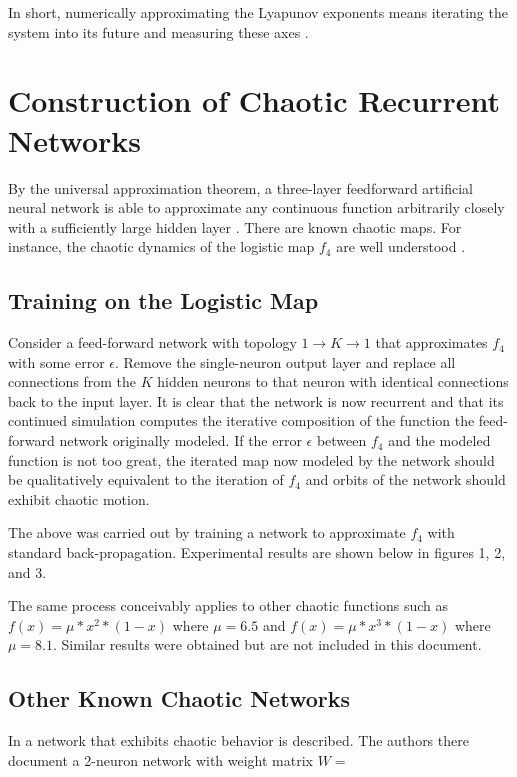 \documentclass[12pt]{article}
\begin{document}
In short, numerically approximating the Lyapunov exponents means
iterating the system into its future and measuring these axes \cite{sprott}.

\section{Construction of Chaotic Recurrent Networks}
By the universal approximation theorem, a three-layer feedforward artificial
neural network is able to approximate any continuous function arbitrarily
closely with a sufficiently large hidden layer \cite{universal}.
There are known chaotic maps.  For instance, the chaotic dynamics of the
logistic map $f_{4}$ are well
understood \cite{alligood, hirsch, devaney, sprott}.

\subsection{Training on the Logistic Map}

Consider a feed-forward network with topology $1 \rightarrow K \rightarrow 1$ 
that approximates $f_{4}$ with some error $\epsilon$.  Remove the single-neuron
output layer and replace all connections from the $K$ hidden neurons to that
neuron with identical connections back to the input layer.  It is clear that
the network is now recurrent and that its continued simulation computes the
iterative composition of the function the feed-forward network originally
modeled.  If the error $\epsilon$ between $f_{4}$ and the modeled function
is not too great, the iterated map now modeled by the network should be
qualitatively equivalent to the iteration of $f_{4}$ and orbits of the network
should exhibit chaotic motion.

The above was carried out by training a network to approximate $f_{4}$ with
standard back-propagation.  Experimental results are shown below in 
figures 1, 2, and 3.

The same process conceivably applies to other chaotic functions such as
$f(x) = \mu * x^{2} *(1-x)$ where $\mu=6.5$ and $f(x)=\mu * x^{3} * (1-x)$
where $\mu=8.1$.  Similar results were obtained but are not included in this
document.

\subsection{Other Known Chaotic Networks}
In \cite{sole} a network that exhibits chaotic behavior is described.  The
authors there document a 2-neuron network with weight matrix $W=$
\end{document}
